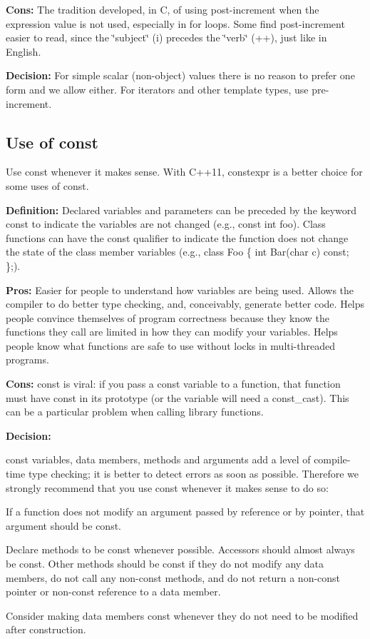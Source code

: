 {\bfseries Cons\+:} The tradition developed, in C, of using post-\/increment when the expression value is not used, especially in for loops. Some find post-\/increment easier to read, since the \char`\"{}subject\char`\"{} (i) precedes the \char`\"{}verb\char`\"{} (++), just like in English.

{\bfseries Decision\+:} For simple scalar (non-\/object) values there is no reason to prefer one form and we allow either. For iterators and other template types, use pre-\/increment.

\subsection*{Use of const}

Use {\ttfamily const} whenever it makes sense. With C++11, {\ttfamily constexpr} is a better choice for some uses of {\ttfamily const}.

{\bfseries Definition\+:} Declared variables and parameters can be preceded by the keyword const to indicate the variables are not changed (e.\+g., {\ttfamily const int foo}). Class functions can have the {\ttfamily const} qualifier to indicate the function does not change the state of the class member variables (e.\+g., {\ttfamily class Foo \{ int Bar(char c) const; \};}).

{\bfseries Pros\+:} Easier for people to understand how variables are being used. Allows the compiler to do better type checking, and, conceivably, generate better code. Helps people convince themselves of program correctness because they know the functions they call are limited in how they can modify your variables. Helps people know what functions are safe to use without locks in multi-\/threaded programs.

{\bfseries Cons\+:} {\ttfamily const} is viral\+: if you pass a const variable to a function, that function must have {\ttfamily const} in its prototype (or the variable will need a {\ttfamily const\+\_\+cast}). This can be a particular problem when calling library functions.

{\bfseries Decision\+:}

{\ttfamily const} variables, data members, methods and arguments add a level of compile-\/time type checking; it is better to detect errors as soon as possible. Therefore we strongly recommend that you use {\ttfamily const} whenever it makes sense to do so\+:


\begin{DoxyItemize}
\item If a function does not modify an argument passed by reference or by pointer, that argument should be {\ttfamily const}.
\item Declare methods to be {\ttfamily const} whenever possible. Accessors should almost always be {\ttfamily const}. Other methods should be {\ttfamily const} if they do not modify any data members, do not call any non-\/const methods, and do not return a non-\/const pointer or non-\/const reference to a data member.
\item Consider making data members {\ttfamily const} whenever they do not need to be modified after construction.
\end{DoxyItemize}

